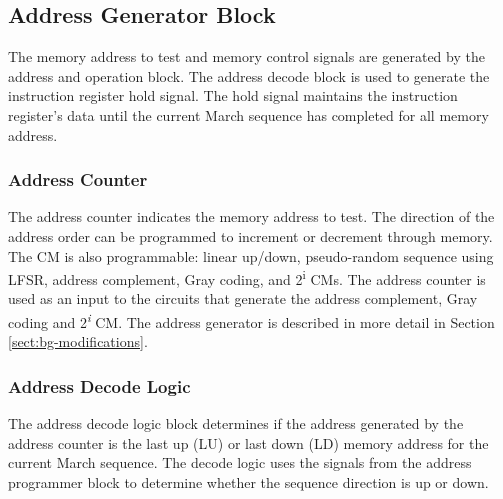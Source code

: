 \subsection{Address Generator Block}
\label{sect:bg-blocks-address-generator}
The memory address to test and memory control signals are generated by the address and operation block.  The address decode block is used to generate the instruction register hold signal.  The hold signal maintains the instruction register's data until the current March sequence has completed for all memory address.  

\subsubsection{Address Counter}
The address counter indicates the memory address to test.  The direction of the address order can be programmed to increment or decrement through memory.  The CM is also programmable: linear up/down, pseudo-random sequence using LFSR, address complement, Gray coding, and 2\textsuperscript{i} CMs.  The address counter is used as an input to the circuits that generate the address complement, Gray coding  and 2\textsuperscript{\textit{i}} CM.  The address generator is described in more detail in Section \ref{sect:bg-modifications}.
 
\subsubsection{Address Decode Logic}
The address decode logic block determines if the address generated by the address counter is the last up (LU) or last down (LD) memory address for the current March sequence.  The decode logic uses the signals from the address programmer block to determine whether the sequence direction is up or down.   


